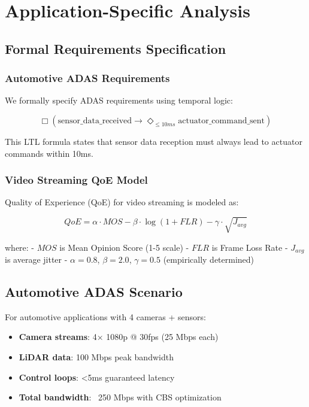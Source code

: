 \documentclass[10pt, journal, compsoc]{IEEEtran}
\begin{document}
\section{Application-Specific Analysis}

\subsection{Formal Requirements Specification}

\subsubsection{Automotive ADAS Requirements}

We formally specify ADAS requirements using temporal logic:

\begin{equation}
\Box(\text{sensor\_data\_received} \rightarrow \Diamond_{\leq 10ms} \text{actuator\_command\_sent})
\end{equation}

This LTL formula states that sensor data reception must always lead to actuator commands within 10ms.

\subsubsection{Video Streaming QoE Model}

Quality of Experience (QoE) for video streaming is modeled as:

\begin{equation}
QoE = \alpha \cdot MOS - \beta \cdot \log(1 + FLR) - \gamma \cdot \sqrt{J_{avg}}
\end{equation}

where:
- $MOS$ is Mean Opinion Score (1-5 scale)
- $FLR$ is Frame Loss Rate
- $J_{avg}$ is average jitter
- $\alpha = 0.8$, $\beta = 2.0$, $\gamma = 0.5$ (empirically determined)

\subsection{Automotive ADAS Scenario}

For automotive applications with 4 cameras + sensors:

\begin{itemize}
    \item \textbf{Camera streams}: 4× 1080p @ 30fps (25 Mbps each)
    \item \textbf{LiDAR data}: 100 Mbps peak bandwidth
    \item \textbf{Control loops}: <5ms guaranteed latency
    \item \textbf{Total bandwidth}: ~250 Mbps with CBS optimization
\end{itemize}
\end{document}
